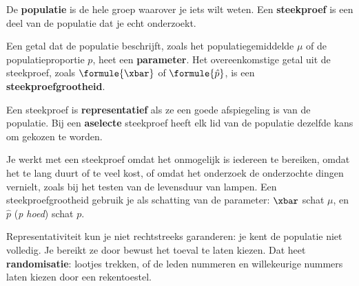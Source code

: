\begin{theorie}
De \textbf{\textcolor{accent}{populatie}} is de hele groep waarover je iets wilt weten. Een \textbf{\textcolor{accent}{steekproef}} is een deel van de populatie dat je echt onderzoekt.

\vspace{1mm}
Een getal dat de populatie beschrijft, zoals het populatiegemiddelde $\mu$ of de populatieproportie $p$, heet een \textbf{\textcolor{accent}{parameter}}. Het overeenkomstige getal uit de steekproef, zoals $\formule{\xbar}$ of $\formule{\hat{p}}$, is een \textbf{\textcolor{accent}{steekproefgrootheid}}.

\vspace{1mm}
Een steekproef is \textbf{\textcolor{accent}{representatief}} als ze een goede afspiegeling is van de populatie. Bij een \textbf{\textcolor{accent}{aselecte}} steekproef heeft elk lid van de populatie dezelfde kans om gekozen te worden.
\end{theorie}

Je werkt met een steekproef omdat het onmogelijk is iedereen te bereiken, omdat het te lang duurt of te veel kost, of omdat het onderzoek de onderzochte dingen vernielt, zoals bij het testen van de levensduur van lampen. Een steekproefgrootheid gebruik je als schatting van de parameter: $\xbar$ schat $\mu$, en $\hat{p}$ (\textit{p hoed}) schat $p$.

Representativiteit kun je niet rechtstreeks garanderen: je kent de populatie niet volledig. Je bereikt ze door bewust het toeval te laten kiezen. Dat heet \textbf{randomisatie}: lootjes trekken, of de leden nummeren en willekeurige nummers laten kiezen door een rekentoestel.


